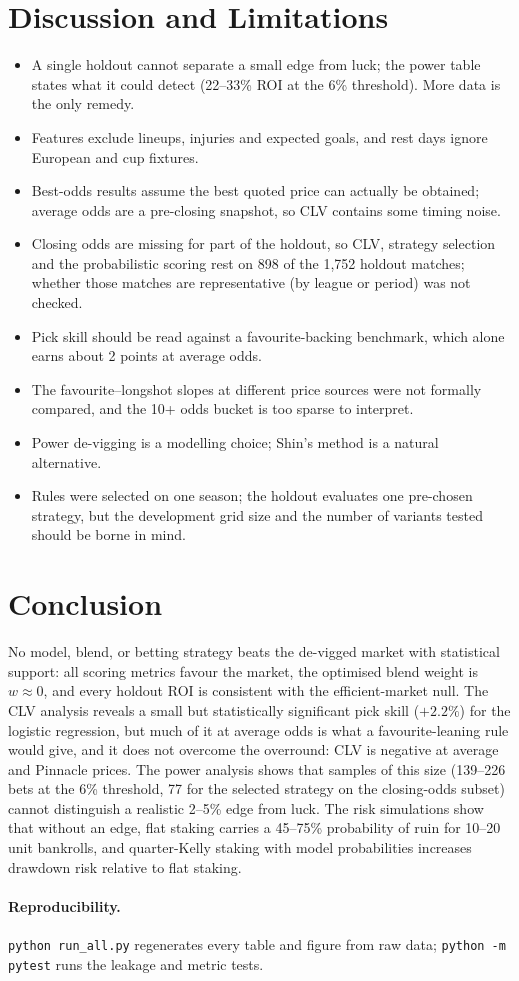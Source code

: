 \documentclass[11pt,a4paper]{article}
\begin{document}
\section{Discussion and Limitations}
\begin{itemize}[noitemsep]
  \item A single holdout cannot separate a small edge from luck; the power table states what it could detect (22--33\% ROI at the 6\% threshold). More data is the only remedy.
  \item Features exclude lineups, injuries and expected goals, and rest days ignore European and cup fixtures.
  \item Best-odds results assume the best quoted price can actually be obtained; average odds are a pre-closing snapshot, so CLV contains some timing noise.
  \item Closing odds are missing for part of the holdout, so CLV, strategy selection and the probabilistic scoring rest on 898 of the 1,752 holdout matches; whether those matches are representative (by league or period) was not checked.
  \item Pick skill should be read against a favourite-backing benchmark, which alone earns about 2 points at average odds.
  \item The favourite--longshot slopes at different price sources were not formally compared, and the 10+ odds bucket is too sparse to interpret.
  \item Power de-vigging is a modelling choice; Shin's method is a natural alternative.
  \item Rules were selected on one season; the holdout evaluates one pre-chosen strategy, but the development grid size and the number of variants tested should be borne in mind.
\end{itemize}

\section{Conclusion}
No model, blend, or betting strategy beats the de-vigged market with statistical support: all scoring metrics favour the market, the optimised blend weight is $w\approx0$, and every holdout ROI is consistent with the efficient-market null. The CLV analysis reveals a small but statistically significant pick skill ($+2.2\%$) for the logistic regression, but much of it at average odds is what a favourite-leaning rule would give, and it does not overcome the overround: CLV is negative at average and Pinnacle prices. The power analysis shows that samples of this size (139--226 bets at the 6\% threshold, 77 for the selected strategy on the closing-odds subset) cannot distinguish a realistic 2--5\% edge from luck. The risk simulations show that without an edge, flat staking carries a 45--75\% probability of ruin for 10--20 unit bankrolls, and quarter-Kelly staking with model probabilities increases drawdown risk relative to flat staking.

\paragraph{Reproducibility.} \texttt{python run\_all.py} regenerates every table and figure from raw data; \texttt{python -m pytest} runs the leakage and metric tests.
\end{document}
